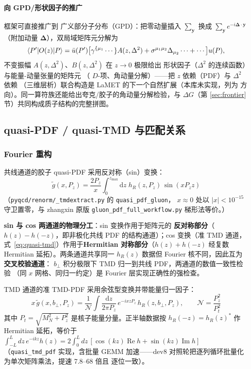 \documentclass[11pt,a4paper]{ctexart}
\newcommand{\LaMET}{\text{LaMET}}
\newcommand{\abs}[1]{\lvert #1\rvert}
\newcommand{\code}[1]{\texttt{#1}}
\newcommand{\bperp}{b_{\perp}}
\begin{document}
\paragraph{向 GPD/形状因子的推广}\LaMET{} 框架可直接推广到
广义部分子分布（GPD）：把零动量插入 $\sum_{\mathbf y}$ 换成
$\sum_{\mathbf y}e^{-i\boldsymbol\Delta\cdot\mathbf y}$（附加动量
$\boldsymbol\Delta$），双局域矩阵元分解为
\begin{equation}
\braket{P'|O(z)|P} = \bar u(P')\bigl[\gamma^{\{\mu_1}\cdots\}
A(z,\Delta^2) + \sigma^{\mu_1\mu_2}\Delta_{\mu_2}\cdots
+\cdots\bigr]u(P),
\end{equation}
不变振幅 $A(z,\Delta^2)$、$B(z,\Delta^2)$ 在 $z\to0$ 极限给出
形状因子（$\Delta^2$ 的连续函数）与能量-动量张量的矩阵元
（ $D$-项、角动量分解）——把 $z$ 依赖（PDF）与 $\Delta^2$ 依赖
（三维层析）联合构造是 LaMET 的下一个自然扩展（本库未实现，列为
方向）。同一算符族还能给出夸克/胶子的角动量分解检验，与
$\Delta G$（第 \ref{sec:frontier} 节）共同构成质子结构的完整拼图。

\subsection{quasi-PDF / quasi-TMD 与匹配关系}

\subsubsection{Fourier 重构}

共线通道的胶子 quasi-PDF 采用反对称（sin）变换：
\begin{equation}\label{eq:quasi-pdf-sin}
\tilde{g}(x, P_z) = \frac{2P_z}{x} \int_{0}^{z_{\text{max}}}
\mathrm{d}z \; h_R(z, P_z) \, \sin(x P_z z)
\end{equation}
（\code{pyqcd/renorm/\_tmdextract.py} 的 \code{quasi\_pdf\_gluon}，
$x\approx0$ 处以 $\abs{x}<10^{-15}$ 守卫置零，与 zhangxin 原版
\code{gluon\_pdf\_full\_workflow.py} 梯形法等价。）

\textbf{sin 与 cos 两通道的物理分工}：sin 变换作用于矩阵元的
\textbf{反对称部分}（$h(z)-h(-z)$，即非极化共线 PDF 的结构通道）；cos
变换（准 TMD 通道，式~\eqref{eq:quasi-tmd}）作用于\textbf{Hermitian
对称部分}（$h(z)+h(-z)$ 经复数 Hermitian 延拓）。两条通道共享同一
$h_R(z)$ 数据但 Fourier 核不同，因此互为\textbf{交叉校验通道}：
$b_\perp$ 积分极限下 TMD 归一到共线 PDF，两通道的数值一致性检验
（同 $x$ 网格、同归一约定）是 Fourier 层实现正确性的强检查。

TMD 通道的准 TMD-PDF 采用余弦型变换并带能量归一因子：
\begin{equation}\label{eq:quasi-tmd}
x\,\tilde{g}(x, \bperp, P_z) = \frac{1}{\mathcal{N}}
\int \frac{\mathrm{d}z}{2\pi P_z}\,
e^{-ixzP_z}\,h_R(z, \bperp, P_z),
\qquad \mathcal{N} = \frac{P_z^2}{P_t^2}
\end{equation}
其中 $P_t = \sqrt{M_N^2 + P_z^2}$ 是核子能量分量。正半轴数据按
$h_R(-z) = h_R(z)^*$ 作 Hermitian 延拓，等价于
$\int_{-L}^{L}dz\,e^{-ikz}h(z) = 2\int_0^L dz\,[\cos(kz)\operatorname{Re}h
+ \sin(kz)\operatorname{Im}h]$（\code{quasi\_tmd\_pdf} 实现，含批量 GEMM
加速——dev8 对照轮把逐列循环批量化为单次矩阵乘法，提速 7.8--68 倍且
逐位一致）。
\end{document}
